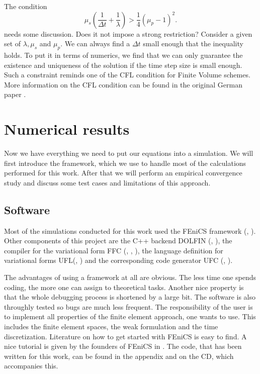 \documentclass[12pt,a4paper,twoside, open=right]{scrreprt}
\theoremstyle{definition}
\theoremstyle{plain}
\begin{document}
The condition 
\begin{equation}
\mu_s\left(\frac{1}{\Delta t}+\frac{1}{\lambda}\right)>\frac{1}{4}(\mu_p-1)^2.
\end{equation} needs some discussion. Does it not impose a strong restriction? Consider a given set of $\lambda,\mu_s$ and $\mu_p$. We can always find a $\Delta t$ small enough that the inequality holds. To put it in terms of numerics, we find that we can only guarantee the existence and uniqueness of the solution if the time step size is small enough. Such a constraint reminds one of the \textsc{CFL} condition for Finite Volume schemes. More information on the CFL condition can be found in the original German paper \cite{Courant1928}.
\section{Numerical results}
Now we have everything we need to put our equations into a simulation. We will first introduce the framework, which we use to handle most of the calculations performed for this work. After that we will perform an empirical convergence study and discuss some test cases and limitations of this approach.
\subsection{Software}
Most of the simulations conducted for this work used the FEniCS framework (\cite{AlnaesBlechta2015a}, \cite{LoggMardalEtAl2012a}). Other components of this project are the C++ backend DOLFIN (\cite{LoggWells2010a}, \cite{LoggWellsEtAl2012a}), the compiler for the variational form FFC (\cite{KirbyLogg2006a}, \cite{LoggOlgaardEtAl2012a}, \cite{OlgaardWells2010b}), the language definition for variational forms UFL(\cite{AlnaesEtAl2012}, \cite{Alnaes2012a}) and the corresponding code generator UFC (\cite{AlnaesLoggEtAl2009a}, \cite{AlnaesLoggEtAl2012a}).
\par 
The advantages of using a framework at all are obvious. The less time one spends coding, the more one can assign to theoretical tasks. Another nice property is that the whole debugging process is shortened by a large bit. The software is also throughly tested so bugs are much less frequent. The responsibility of the user is to implement all properties of the finite element approach, one wants to use. This includes the finite element spaces, the weak formulation and the time discretization. Literature on how to get started with FEniCS is easy to find. A nice tutorial is given by the founders of FEniCS in  \cite{Langtangen2017a}. The code, that has been written for this work, can be found in the appendix and on the CD, which accompanies this. 
\end{document}
